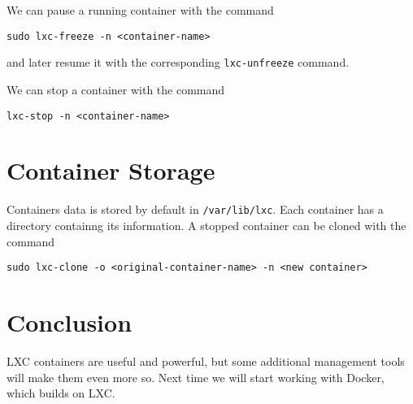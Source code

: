 \documentclass{article}
\begin{document}
We can pause a running container with the command 

\begin{verbatim}
sudo lxc-freeze -n <container-name>
\end{verbatim} 

and later resume it with the corresponding \texttt{lxc-unfreeze} command.

We can stop a container with the command

\begin{verbatim}
lxc-stop -n <container-name>
\end{verbatim}

\section{Container Storage}
Containers data is stored by default in \texttt{/var/lib/lxc}. Each container has a directory containng its information.  A stopped container can be cloned with the command

\begin{verbatim}
sudo lxc-clone -o <original-container-name> -n <new container>
\end{verbatim}

\section{Conclusion} 
LXC containers are useful and powerful, but some additional management tools will make them even more so. Next time we will start working with Docker, which builds on LXC.
\end{document}
